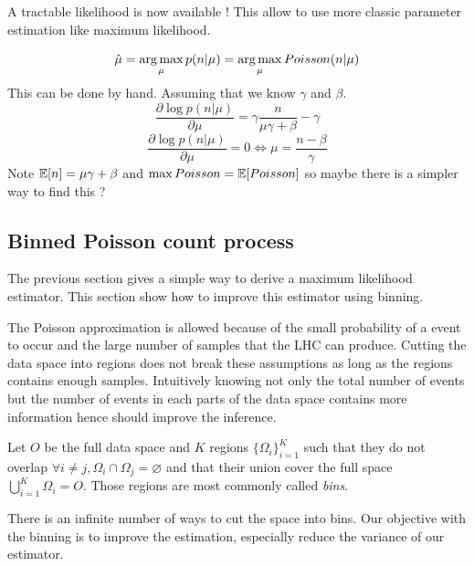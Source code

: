 A tractable likelihood is now available !
This allow to use more classic parameter estimation like maximum likelihood.

\begin{equation}
    \hat \mu = \operatorname*{arg\,max}_\mu p(n|\mu) =  \operatorname*{arg\,max}_\mu Poisson(n|\mu)
\end{equation}
This can be done by hand. Assuming that we know $\gamma$ and  $\beta$.
\begin{equation}
    \frac{\partial \log p(n|\mu)}{\partial \mu} =  \gamma \frac{n}{\mu\gamma + \beta} - \gamma
\end{equation}
\begin{equation}
    \frac{\partial \log p(n|\mu)}{\partial \mu} = 0 \iff \mu = \frac{n-\beta}{\gamma}
\end{equation}
Note $\mathbb{E}[n] = \mu\gamma + \beta$ and $\max Poisson = \mathbb{E}[Poisson]$ so maybe there is a simpler way to find this ?






\subsection{Binned Poisson count process} %
\label{sub:binned_poisson_count_process}

The previous section gives a simple way to derive a maximum likelihood estimator.
This section show how to improve this estimator using binning.

The Poisson approximation is allowed because of the small probability of a event to occur and the large number of samples that the LHC can produce.
Cutting the data space into regions does not break these assumptions as long as the regions contains enough samples.
Intuitively knowing not only the total number of events but the number of events in each parts of the data space contains more information hence should improve the inference.

Let $O$ be the full data space and $K$ regions $\{\Omega_i\}_{i=1}^K$ such that they do not overlap $\forall i\neq j, \Omega_i \cap \Omega_j = \varnothing $ and that their union cover the full space $\bigcup_{i=1}^K \Omega_i = O$.
Those regions are most commonly called \emph{bins}.

There is an infinite number of ways to cut the space into bins.
Our objective with the binning is to improve the estimation, especially reduce the variance of our estimator.

